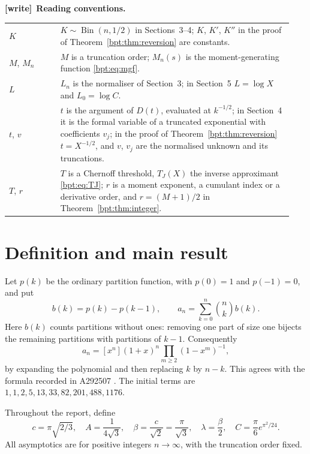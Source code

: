 \documentclass[11pt]{article}
\theoremstyle{remark}\newtheorem{remark}[theorem]{Remark}
\newenvironment{writenote}[1][]{\par\smallskip\begingroup\small
 \noindent\textbf{[write]}\if\relax\detokenize{#1}\relax\else~\textbf{#1.}\fi\ }%
 {\par\endgroup\smallskip}
\begin{document}
\begin{writenote}[Reading conventions]
\begin{tabular}{@{}>{\raggedright\arraybackslash}p{0.17\linewidth}
 >{\raggedright\arraybackslash}p{0.77\linewidth}@{}}
$K$ & $K\sim\operatorname{Bin}(n,1/2)$ in Sections~3--4; $K$, $K'$, $K''$ in
 the proof of Theorem~\ref{bpt:thm:reversion} are constants. \\
$M$, $M_n$ & $M$ is a truncation order; $M_n(s)$ is the moment-generating
 function \eqref{bpt:eq:mgf}. \\
$L$ & $L_n$ is the normaliser of Section~3; in Section~5 $L=\log X$ and
 $L_0=\log C$. \\
$t$, $v$ & $t$ is the argument of $D(t)$, evaluated at $k^{-1/2}$; in
 Section~4 it is the formal variable of a truncated exponential with
 coefficients $v_j$; in the proof of Theorem~\ref{bpt:thm:reversion}
 $t=X^{-1/2}$, and $v$, $v_j$ are the normalised unknown and its
 truncations. \\
$T$, $r$ & $T$ is a Chernoff threshold, $T_J(X)$ the inverse approximant
 \eqref{bpt:eq:TJ}; $r$ is a moment exponent, a cumulant index or a
 derivative order, and $r=(M+1)/2$ in Theorem~\ref{bpt:thm:integer}. \\
\bottomrule
\end{tabular}
\end{writenote}

\section{Definition and main result}
Let $p(k)$ be the ordinary partition function, with $p(0)=1$ and $p(-1)=0$, and put
\begin{equation}\label{bpt:eq:def}
 b(k)=p(k)-p(k-1),\qquad
 a_n=\sum_{k=0}^n\binom nk b(k).
\end{equation}
Here $b(k)$ counts partitions without ones: removing one part of size one bijects the remaining partitions with partitions of $k-1$. Consequently
\[
 a_n=[x^n](1+x)^n\prod_{m\ge2}(1-x^m)^{-1},
\]
by expanding the polynomial and then replacing $k$ by $n-k$. This agrees with the formula recorded in A292507 \cite{oeis292507}. The initial terms are
$1,1,2,5,13,33,82,201,488,1176$.

Throughout the report, define
\begin{equation}\label{bpt:eq:constants}
 c=\pi\sqrt{2/3},\quad A=\frac1{4\sqrt3},\quad
 \beta=\frac c{\sqrt2}=\frac\pi{\sqrt3},\quad
 \lambda=\frac\beta2,\quad
 C=\frac\pi6 e^{\pi^2/24}.
\end{equation}
All asymptotics are for positive integers $n\to\infty$, with the truncation order fixed.
\end{document}
